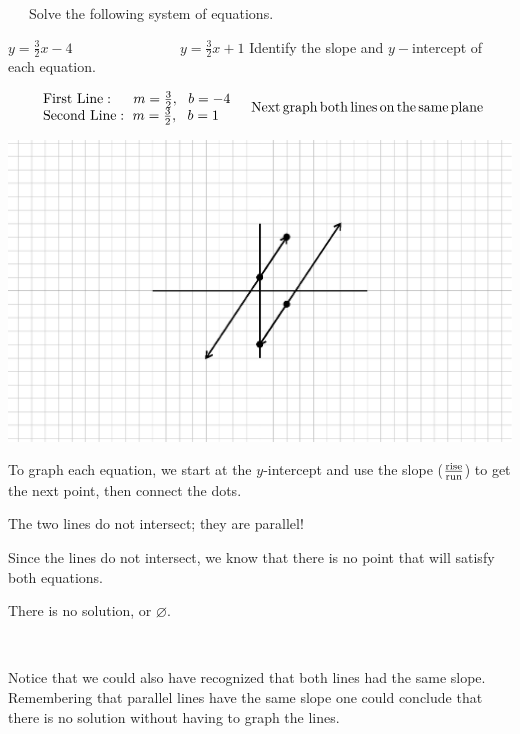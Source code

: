 \begin{example}~~~Solve the following system of equations.
    \begin{center}
      $y = \frac{3}{2} x - 4$ ~~~~~~~~~~~~~~ $y = \frac{3}{2} x + 1$\pp
		Identify the slope and $y-$intercept of each equation.
		\end{center}
  \begin{eqnarray*}
		\begin{array}{l}
			\operatorname{First~Line} : ~~~~m = \frac{3}{2}, ~~b = -4\\
      \operatorname{Second~Line} : ~m = \frac{3}{2}, ~~b = 1
    \end{array} &  & \operatorname{Next} \operatorname{graph} \operatorname{both}
    \operatorname{lines} \operatorname{on} \operatorname{the} \operatorname{same} \operatorname{plane}\\
	\end{eqnarray*}
  \begin{multicols}{2}
    \includegraphics[scale=.85,bb = 115 65 310 190, clip=true]{II_2_1-3.eps}


    To graph each equation, we start at the $y$-intercept and use the slope
    ($\frac{\operatorname{rise}}{\operatorname{run}}$) to get the next point, then connect the
    dots.\pp
    
    The two lines do not intersect; they are parallel!
	\end{multicols}
	 Since the lines do not intersect, we know that there is no point that will satisfy both equations.  
		\begin{center}    
    There is no solution, or $\varnothing$.
		\end{center}
\end{example}
~\par  
Notice that we could also have recognized that both lines had the same slope. Remembering
that parallel lines have the same slope one could conclude that there is no
solution without having to graph the lines.\pp

